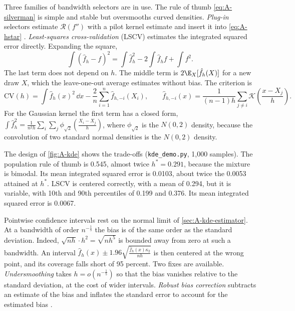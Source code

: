 Three families of bandwidth selectors are in use. The rule of thumb \eqref{eq:A-silverman} is simple
and stable but oversmooths curved densities. \emph{Plug-in} selectors estimate $\mathcal{R}(f'')$ with
a pilot kernel estimate and insert it into \eqref{eq:A-hstar} \citep{SheatherJones1991}.
\emph{Least-squares cross-validation} (LSCV) estimates the integrated squared error directly. Expanding
the square,
\begin{equation*}
\int(\hat f_h-f)^2=\int\hat f_h^2-2\int\hat f_hf+\int f^2 .
\end{equation*}
The last term does not depend on $h$. The middle term is $2\E_X[\hat f_h(X)]$ for a new draw $X$, which
the leave-one-out average estimates without bias. The criterion is
\begin{equation}\label{eq:A-lscv}
\mathrm{CV}(h)=\int\hat f_h(x)^2\,\dd x-\frac{2}{n}\sum_{i=1}^{n}\hat f_{h,-i}(X_i),\qquad
\hat f_{h,-i}(x)=\frac{1}{(n-1)h}\sum_{j\ne i}\mathcal{K}\!\left(\frac{x-X_j}{h}\right).
\end{equation}
For the Gaussian kernel the first term has a closed form,
$\int\hat f_h^2=\frac{1}{n^2h}\sum_i\sum_j\phi_{\sqrt2}(\frac{X_i-X_j}{h})$, where $\phi_{\sqrt2}$ is the
$N(0,2)$ density, because the convolution of two standard normal densities is the $N(0,2)$ density.

The design of \cref{fig:A-kde} shows the trade-offs (\texttt{kde\_demo.py}, 1,000 samples). The
population rule of thumb is 0.545, almost twice $h^*=0.291$, because the mixture is bimodal. Its mean
integrated squared error is 0.0103, about twice the 0.0053 attained at $h^*$. LSCV is centered
correctly, with a mean of 0.294, but it is variable, with 10th and 90th percentiles of 0.199 and 0.376.
Its mean integrated squared error is 0.0067.

Pointwise confidence intervals rest on the normal limit of \cref{sec:A-kde-estimator}. At a bandwidth
of order $n^{-\frac{1}{5}}$ the bias is of the same order as the standard deviation. Indeed,
$\sqrt{nh}\cdot h^2=\sqrt{nh^5}$ is bounded away from zero at such a bandwidth. An interval
$\hat f_h(x)\pm1.96\sqrt{\frac{\hat f_h(x)\kappa_2}{nh}}$ is then centered at the wrong point, and its
coverage falls short of 95 percent. Two fixes are available. \emph{Undersmoothing} takes
$h=o(n^{-\frac{1}{5}})$ so that the bias vanishes relative to the standard deviation, at the cost of
wider intervals. \emph{Robust bias correction} subtracts an estimate of the bias and inflates the
standard error to account for the estimated bias \citep{CalonicoCattaneoFarrell2018}.

